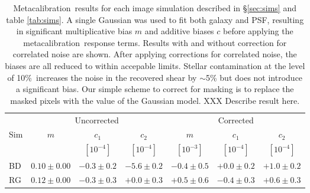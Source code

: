 \documentclass[usegraphicx,usenatbib]{mn2e}
\newcommand{\mcal}{metacalibration}
\newcommand{\Mcal}{Metacalibration}
\newcommand{\nsimNstarperc}{10\%}
\begin{document}
\begin{table}
    \centering
    \caption{\Mcal\ results for each image simulation described in
        \S \ref{sec:sims} and table \ref{tab:sims}.  A single Gaussian was used
    to fit both galaxy and PSF, resulting in significant multiplicative 
    bias $m$ and additive biases $c$ before applying the \mcal\ response
    terms. Results with and without correction
    for correlated noise are shown.  After applying corrections for
    correlated noise, the biases are all reduced to within accepable limits.
    Stellar contamination at the level of \nsimNstarperc\ increases
    the noise in the recovered shear by $\sim$5\% but does not introduce 
    a significant bias.  
    Our simple scheme to correct for masking is to
    replace the masked pixels with the value of the Gaussian model.  XXX Describe
    result here.
    \label{tab:results}}
    \begin{tabular}{ |l|  c|c|c|  c|c|c|}
        \hline
        & \multicolumn{3}{c}{Uncorrected} & \multicolumn{3}{c}{Corrected} \\
        Sim         & $m$             & $c_1$             & $c_2$            & $m$             & $c_1$         & $c_2$ \\
                    &                 & $[10^{-4}]$       & $[10^{-4}]$      & $[10^{-3}]$     & $[10^{-4}]$   & $[10^{-4}]$ \\
        \hline
        BD          & $0.10 \pm 0.00$ & $-0.3 \pm 0.2$    & $-5.6 \pm 0.2$   & $ -0.4 \pm 0.5$ & $+0.0 \pm 0.2$ & $+1.0 \pm 0.2$  \\
        RG          & $0.12 \pm 0.00$ & $-0.3 \pm 0.3$    & $+0.0 \pm 0.3$     & $+0.5 \pm 0.6$     & $-0.4 \pm 0.3$    & $+0.6 \pm 0.3$ \\
    \end{tabular}
\end{table}
\end{document}

